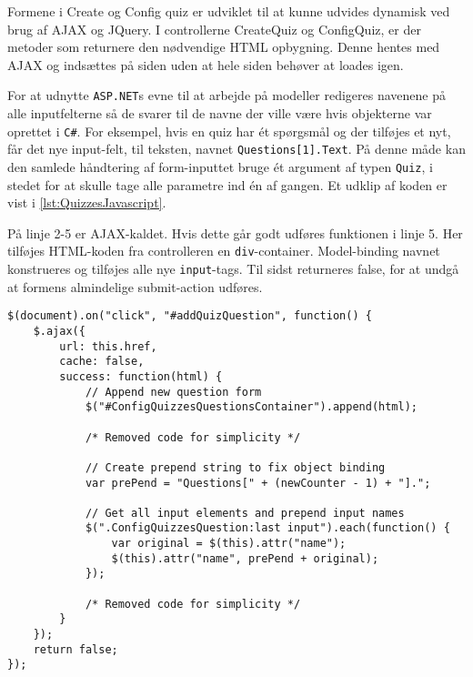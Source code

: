 Formene i Create og Config quiz er udviklet til at kunne udvides dynamisk ved brug af AJAX og JQuery. I controllerne CreateQuiz og ConfigQuiz, er der metoder som returnere den nødvendige HTML opbygning. Denne hentes med AJAX og indsættes på siden uden at hele siden behøver at loades igen.

For at udnytte \verb+ASP.NET+s evne til at arbejde på modeller redigeres navenene på alle inputfelterne så de svarer til de navne der ville være hvis objekterne var oprettet i \verb+C#+.
For eksempel, hvis en quiz har ét spørgsmål og der tilføjes et nyt, får det nye input-felt, til teksten, navnet \verb+Questions[1].Text+.
På denne måde kan den samlede håndtering af form-inputtet bruge ét argument af typen \verb+Quiz+, i stedet for at skulle tage alle parametre ind én af gangen. Et udklip af koden er vist i \lstlistingname \ref{lst:QuizzesJavascript}.

På linje 2-5 er AJAX-kaldet. Hvis dette går godt udføres funktionen i linje 5. Her tilføjes HTML-koden fra controlleren en \verb+div+-container. Model-binding navnet konstrueres og tilføjes alle nye \verb+input+-tags. Til sidst returneres false, for at undgå at formens almindelige submit-action udføres.

\begin{lstlisting}[caption=JavaScript udklip til AJAX og model-binding håndtering ved indsættelse af nye spørgsmål, label=lst:QuizzesJavascript]
$(document).on("click", "#addQuizQuestion", function() {
    $.ajax({
        url: this.href,
        cache: false,
        success: function(html) {
            // Append new question form
            $("#ConfigQuizzesQuestionsContainer").append(html);

            /* Removed code for simplicity */
			
            // Create prepend string to fix object binding
            var prePend = "Questions[" + (newCounter - 1) + "].";

            // Get all input elements and prepend input names
            $(".ConfigQuizzesQuestion:last input").each(function() {
                var original = $(this).attr("name");
                $(this).attr("name", prePend + original);
            });
            
            /* Removed code for simplicity */
        }
    });
    return false;
});
\end{lstlisting}